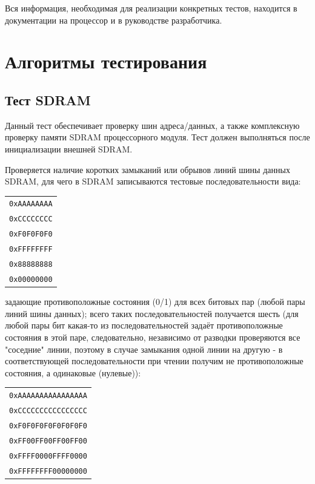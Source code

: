 \documentclass[a4paper,14pt,bachelor]{disser}
\begin{document}
Вся информация, необходимая для реализации конкретных тестов, находится в документации на процессор\cite{tech_ref} и в руководстве разработчика\cite{program_ref}. 

\section{Алгоритмы тестирования}
\subsection{Тест SDRAM}
Данный тест обеспечивает проверку шин адреса/данных, а также комплексную проверку памяти SDRAM процессорного модуля. Тест должен выполняться после инициализации внешней SDRAM\cite{optimize}.

Проверяется наличие коротких замыканий или обрывов линий шины данных SDRAM, для чего в SDRAM записываются тестовые последовательности вида:
\begin{center}
\begin{longtable}{c}
\texttt{0xAAAAAAAA}\\
\texttt{0xCCCCCCCC}\\
\texttt{0xF0F0F0F0}\\
\texttt{0xFFFFFFFF}\\
\texttt{0x88888888}\\
\texttt{0x00000000}\\
\end{longtable}
\end{center}
задающие противоположные состояния (0/1) для всех битовых пар (любой пары линий шины данных); всего таких последовательностей получается шесть (для любой пары бит какая-то из последовательностей задаёт противоположные состояния в этой паре, следовательно, независимо от разводки проверяются все "соседние" линии, поэтому в случае замыкания одной линии на другую - в соответствующей последовательности при чтении получим не противоположные состояния, а одинаковые (нулевые)):
\begin{center}
\begin{longtable}{c}
\texttt{0xAAAAAAAAAAAAAAAA}\\
\texttt{0xCCCCCCCCCCCCCCCC}\\
\texttt{0xF0F0F0F0F0F0F0F0}\\
\texttt{0xFF00FF00FF00FF00}\\
\texttt{0xFFFF0000FFFF0000}\\
\texttt{0xFFFFFFFF00000000}\\
\end{longtable}
\end{center}
\end{document}
